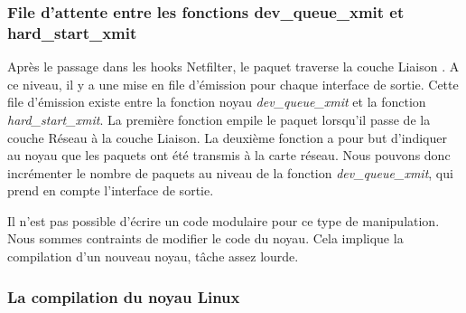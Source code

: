 \documentclass[a4paper]{article}
\begin{document}
\subsubsection{File d'attente entre les fonctions dev\_queue\_xmit et hard\_start\_xmit}

Après le passage dans les hooks Netfilter, le paquet traverse la couche Liaison \cite{intel} \cite{stack}. A ce niveau, il y a une mise en file d’émission pour chaque interface de sortie. Cette file d’émission existe entre la fonction noyau \textit{dev\_queue\_xmit} et la fonction \textit{hard\_start\_xmit}. La première fonction empile le paquet lorsqu’il passe de la couche Réseau à la couche Liaison. La deuxième fonction a pour but d’indiquer au noyau que les paquets ont été transmis à la carte réseau. Nous pouvons donc incrémenter le nombre de paquets au niveau de la fonction \textit{dev\_queue\_xmit}, qui prend en compte l’interface de sortie.

Il n’est pas possible d’écrire un code modulaire pour ce type de manipulation. Nous sommes contraints de modifier le code du noyau. Cela implique la compilation d’un nouveau noyau, tâche assez lourde. 

\subsubsection{La compilation du noyau Linux}
\end{document}
